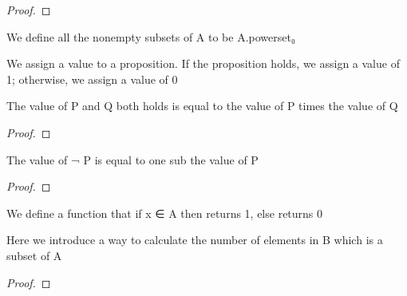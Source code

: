 \begin{proof}
    \leanok
\end{proof}

\begin{definition}\label{Finset.powerset₀}
        \leanok
                We define all the nonempty subsets of A to be A.powerset₀
    \end{definition}

\begin{definition}\label{toInt}
        \leanok
                We assign a value to a proposition. If the proposition holds, we assign a value of 1; otherwise, we assign a value of 0
    \end{definition}

\begin{lemma}\label{toInt_and}
        \leanok
                The value of P and Q both holds is equal to the value of P times the value of Q
    \end{lemma}

\begin{proof}
    \leanok
\end{proof}

\begin{lemma}\label{toInt_not}
        \leanok
                The value of ¬ P is equal to one sub the value of P
    \end{lemma}

\begin{proof}
    \leanok
\end{proof}

\begin{definition}\label{char_fun}
        \leanok
                We define a function that if x ∈ A then returns 1, else returns 0
    \end{definition}

\begin{lemma}\label{card_eq_sum_char_fun}
        \leanok
                Here we introduce a way to calculate the number of elements in B which is a subset of A
    \end{lemma}

\begin{proof}
    \leanok
\end{proof}

